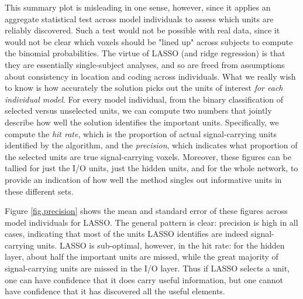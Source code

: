 This summary plot is misleading in one sense, however, since it applies an aggregate statistical test across model individuals to assess which units are reliably discovered. Such a test would not be possible with real data, since it would not be clear which voxels should be "lined up" across subjects to compute the binomial probabilities. The virtue of LASSO (and ridge regression) is that they are essentially single-subject analyses, and so are freed from assumptions about consistency in location and coding across individuals. What we really wish to know is how accurately the solution picks out the units of interest {\em for each individual model}. For every model individual, from the binary classification of selected versus unselected units, we can compute two numbers that jointly describe how well the solution identifies the important units. Specifically, we compute the {\em hit rate}, which is the proportion of actual signal-carrying units identified by the algorithm, and the {\em precision}, which indicates what proportion of the selected units are true signal-carrying voxels. Moreover, these figures can be tallied for just the I/O units, just the hidden units, and for the whole network, to provide an indication of how well the method singles out informative units in these different sets. 

Figure \ref{fig.precision} shows the mean and standard error of these figures across model individuals for LASSO. The general pattern is clear: precision is high in all cases, indicating that most of the units LASSO identifies are indeed signal-carrying units. LASSO is sub-optimal, however, in the hit rate: for the hidden layer, about half the important units are missed, while the great majority of signal-carrying units are missed in the I/O layer. Thus if LASSO selects a unit, one can have confidence that it does carry useful information, but one cannot have confidence that it has discovered all the useful elements.

